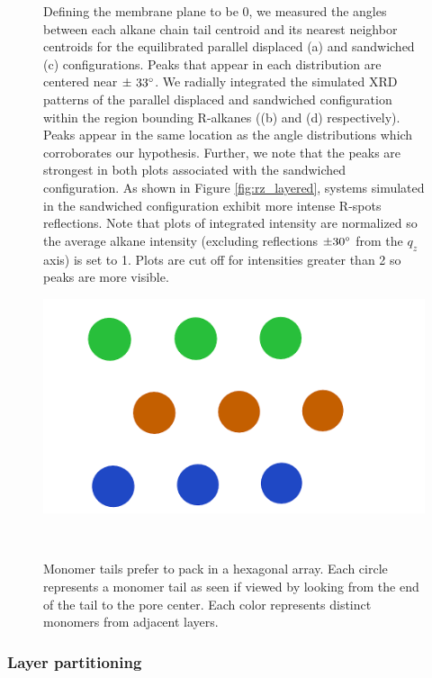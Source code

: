 \documentclass[journal=jpcbfk,manusciprt=article]{achemso}
\begin{document}
\begin{figure}[!htb]
{	  Defining the membrane plane to be 0\degree, we measured the angles between each
	  alkane chain tail centroid and its nearest neighbor centroids for the
	  equilibrated parallel displaced (a) and sandwiched (c) configurations. Peaks
	  that appear in each distribution are centered near $\pm~33\degree$. We radially
	  integrated the simulated XRD patterns of the parallel displaced and sandwiched
	  configuration within the region bounding R-alkanes ((b) and (d) respectively).
	  Peaks appear in the same location as the angle distributions which corroborates
	  our hypothesis. Further, we note that the peaks are strongest in both plots
	  associated with the sandwiched configuration. As shown in Figure
	  \ref{fig:rz_layered}, systems simulated in the sandwiched configuration exhibit
	  more intense R-spots reflections. Note that plots of integrated intensity are
	  normalized so the average alkane intensity (excluding reflections $\pm
	  30\degree$ from the $q_z$ axis) is set to 1.  Plots are cut off for intensities
	  greater than 2 so peaks are more visible.}~\label{fig:tail_packing}
  \end{figure}

  \begin{figure}
	\centering
	\includegraphics[width=0.5\linewidth]{hexagonal_tails_alt2.png} 
	\caption{Monomer tails prefer to pack in a hexagonal array. Each circle
		represents a monomer tail as seen if viewed by looking from the end of the tail
		to the pore center. Each color represents distinct monomers from adjacent
		layers.}~\label{fig:hex_tails}
  \end{figure}
	
  \subsubsection{Layer partitioning}
\end{document}
